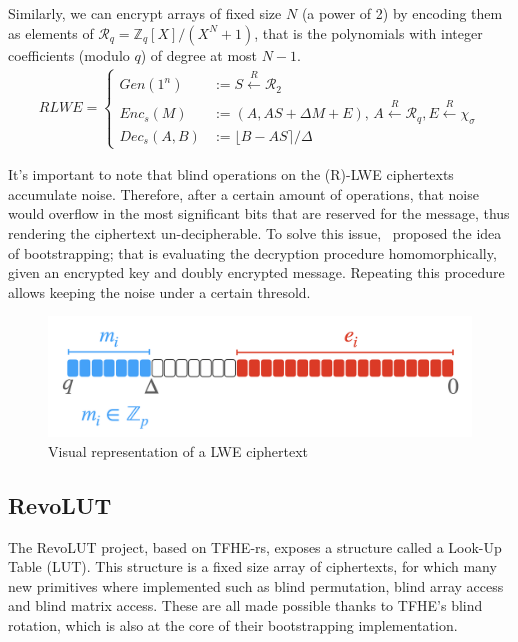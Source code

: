 \documentclass{article}
\begin{document}
Similarly, we can encrypt arrays of fixed size $N$ (a power of 2) by encoding them as elements of $\mathcal{R}_q = \mathbb{Z}_q[X]/(X^N+1)$, that is the polynomials with integer coefficients (modulo $q$) of degree at most $N - 1$.
\begin{align*}
    RLWE = \begin{cases}
        Gen(1^n) &:= S \overset{R}{\gets} \mathcal{R}_2 \\
        Enc_s(M) &:= (A, AS + \Delta M + E),\, A \overset{R}{\gets} \mathcal{R}_q, E \overset{R}{\gets} \chi_\sigma \\
        Dec_s(A, B) &:= \lfloor B - AS \rceil / \Delta
    \end{cases}
\end{align*}

It's important to note that blind operations on the (R)-LWE ciphertexts accumulate noise. Therefore, after a certain amount of operations, that noise would overflow in the most significant bits that are reserved for the message, thus rendering the ciphertext un-decipherable. To solve this issue,~\cite{gentry_fully_2009} proposed the idea of bootstrapping; that is evaluating the decryption procedure homomorphically, given an encrypted key and doubly encrypted message. Repeating this procedure allows keeping the noise under a certain thresold.

\begin{figure}[h]
    \centering
    \includegraphics[scale=0.4]{lwe}
    \caption{Visual representation of a LWE ciphertext\cite{LWE}}
\end{figure}

\newpage

\subsection{RevoLUT}

The RevoLUT project, based on TFHE-rs, exposes a structure called a Look-Up Table (LUT). This structure is a fixed size array of ciphertexts, for which many new primitives where implemented such as blind permutation, blind array access and blind matrix access. These are all made possible thanks to TFHE's blind rotation, which is also at the core of their bootstrapping implementation.
\end{document}

